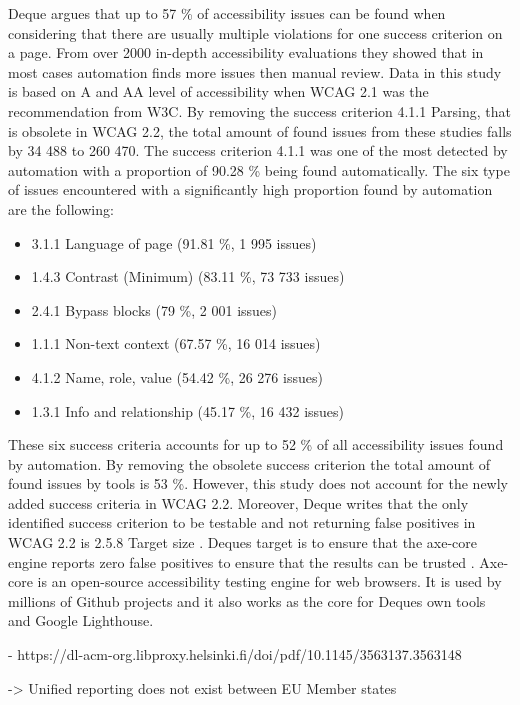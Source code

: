 Deque argues that up to 57 \% of accessibility issues can be found when considering that there are usually multiple violations for one success criterion on a page. From over 2000 in-depth accessibility evaluations they showed that in most cases automation finds more issues then manual review. Data in this study is based on A and AA level of accessibility when WCAG 2.1 was the recommendation from W3C. By removing the success criterion 4.1.1 Parsing, that is obsolete in WCAG 2.2, the total amount of found issues from these studies falls by 34 488 to 260 470. The success criterion 4.1.1 was one of the most detected by automation with a proportion of 90.28 \% being found automatically. The six type of issues encountered with a significantly high proportion found by automation are the following: 

\begin{itemize}
  \item 3.1.1 Language of page (91.81 \%, 1 995 issues)
  \item 1.4.3 Contrast (Minimum) (83.11 \%, 73 733 issues)
  \item 2.4.1 Bypass blocks (79 \%, 2 001 issues)
  \item 1.1.1 Non-text context (67.57 \%, 16 014 issues)
  \item 4.1.2 Name, role, value (54.42 \%, 26 276 issues)
  \item 1.3.1 Info and relationship (45.17 \%, 16 432 issues)
\end{itemize}

These six success criteria accounts for up to 52 \% of all accessibility issues found by automation. By removing the obsolete success criterion the total amount of found issues by tools is 53 \%. However, this study does not account for the newly added success criteria in WCAG 2.2. Moreover, Deque writes that the only identified success criterion to be testable and not returning false positives in WCAG 2.2 is 2.5.8 Target size \citep{dequeaxe4_5}. Deques target is to ensure that the axe-core engine reports zero false positives to ensure that the results can be trusted \citep{dequecoverage}. Axe-core is an open-source accessibility testing engine for web browsers. It is used by millions of Github projects and it also works as the core for Deques own tools and Google Lighthouse.



- https://dl-acm-org.libproxy.helsinki.fi/doi/pdf/10.1145/3563137.3563148

-> Unified reporting does not exist between EU Member states

